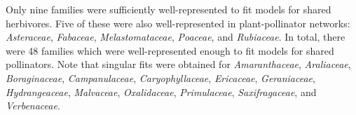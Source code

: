 \documentclass[12pt]{article}
\begin{document}
\begin{spacing}{1.5}
    Only nine families were sufficiently well-represented to fit models for shared herbivores. Five of these were also well-represented in plant-pollinator networks: \emph{Asteraceae}, \emph{Fabaceae}, \emph{Melastomataceae}, \emph{Poaceae}, and \emph{Rubiaceae}. In total, there were 48 families which were well-represented enough to fit models for shared pollinators. Note that singular fits were obtained for \emph{Amaranthaceae}, \emph{Araliaceae}, \emph{Boraginaceae},
    \emph{Campanulaceae}, \emph{Caryophyllaceae}, \emph{Ericaceae}, \emph{Geraniaceae}, 
    \emph{Hydrangeaceae}, \emph{Malvaceae}, \emph{Oxalidaceae}, \emph{Primulaceae}, 
    \emph{Saxifragaceae}, and \emph{Verbenaceae}. 
  



\end{spacing}

\clearpage

\newpage

\renewcommand*{\bibfont}{\raggedright}

\end{document}
